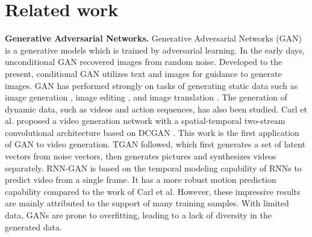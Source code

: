
\section{Related work}

\textbf{Generative Adversarial Networks. }
Generative Adversarial Networks (GAN) is a generative models which is trained by adversarial learning. 
In the early days, unconditional GAN \cite{karras2019style,karras2020analyzing} recovered images from random noise. Developed to the present, conditional GAN \cite{pan2023drag} utilizes text and images for guidance to generate images. GAN has performed strongly on tasks of generating static data such as image generation \cite{karras2019style, karras2020analyzing}, image editing \cite{vinker2021image, patashnik2021styleclip}, and image translation \cite{shao2021spatchgan}.
The generation of dynamic data, such as videos and action sequences, has also been studied. Carl et al. \cite{vondrick2016generating} proposed a video generation network with a spatial-temporal two-stream convolutional architecture based on DCGAN \cite{radford2015unsupervised}. This work is the first application of GAN to video generation. 
TGAN \cite{saito2017temporal} followed, which first generates a set of latent vectors from noise vectors, then generates pictures and synthesizes videos separately.
RNN-GAN \cite{mogren2016c} is based on the temporal modeling capability of RNNs to predict video from a single frame. It has a more robust motion prediction capability compared to the work of Carl et al. However, these impressive results are mainly attributed to the support of many training samples. With limited data, GANs are prone to overfitting, leading to a lack of diversity in the generated data. 


